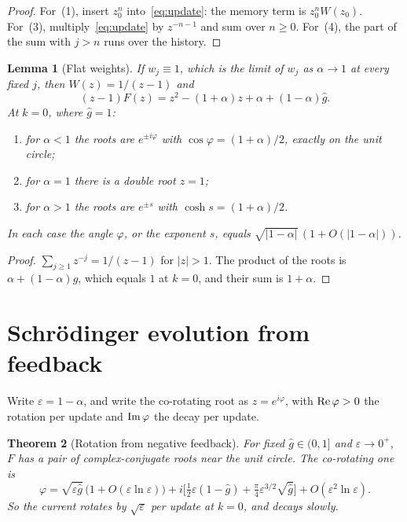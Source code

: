 \documentclass[11pt]{amsart}
\newtheorem{theorem}{Theorem}[section]
\newtheorem{lemma}[theorem]{Lemma}
\theoremstyle{definition}
\theoremstyle{remark}
\newcommand{\eps}{\varepsilon}
\begin{document}
\begin{proof}
For~(1), insert $z_0^n$ into~\eqref{eq:update}: the memory term is $z_0^nW(z_0)$. For~(3), multiply~\eqref{eq:update} by $z^{-n-1}$ and sum over $n\ge0$. For~(4), the part of the sum with $j>n$ runs over the history. \end{proof}

\begin{lemma}[Flat weights]\label{lem:flat}
If $w_j\equiv1$, which is the limit of $w_j$ as $\alpha\to1$ at every fixed $j$, then $W(z)=1/(z-1)$ and
\[
(z-1)F(z)=z^2-(1+\alpha)z+\alpha+(1-\alpha)\hat g .
\]
At $k=0$, where $\hat g=1$:
\begin{enumerate}
\item for $\alpha<1$ the roots are $e^{\pm i\varphi}$ with $\cos\varphi=(1+\alpha)/2$, exactly on the unit circle;
\item for $\alpha=1$ there is a double root $z=1$;
\item for $\alpha>1$ the roots are $e^{\pm s}$ with $\cosh s=(1+\alpha)/2$.
\end{enumerate}
In each case the angle $\varphi$, or the exponent $s$, equals $\sqrt{\lvert1-\alpha\rvert}\,(1+O(\lvert1-\alpha\rvert))$.
\end{lemma}

\begin{proof}
$\sum_{j\ge1}z^{-j}=1/(z-1)$ for $\lvert z\rvert>1$. The product of the roots is $\alpha+(1-\alpha)\hat g$, which equals $1$ at $k=0$, and their sum is $1+\alpha$. \end{proof}

\section{Schr\"odinger evolution from feedback}

Write $\eps=1-\alpha$, and write the co-rotating root as $z=e^{i\varphi}$, with ${\rm Re}\,\varphi>0$ the rotation per update and ${\rm Im}\,\varphi$ the decay per update.

\begin{theorem}[Rotation from negative feedback]\label{thm:rotation}
For fixed $\hat g\in(0,1]$ and $\eps\to0^+$, $F$ has a pair of complex-conjugate roots near the unit circle. The co-rotating one is
\[
\varphi=\sqrt{\eps\hat g}\,\big(1+O(\eps\ln\eps)\big)+i\Big[\tfrac12\eps(1-\hat g)+\tfrac\pi4\eps^{3/2}\sqrt{\hat g}\Big]+O(\eps^2\ln\eps).
\]
So the current rotates by $\sqrt{\eps}$ per update at $k=0$, and decays slowly.
\end{theorem}
\end{document}
